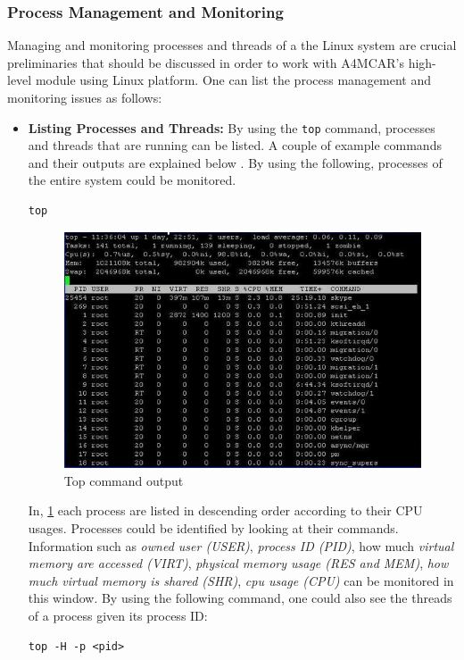 \subsubsection{Process Management and Monitoring}
Managing and monitoring processes and threads of a the Linux system are crucial preliminaries that should be discussed in order to work with A4MCAR's high-level module using Linux platform. One can list the process management and monitoring issues as follows:
\begin{itemize}
	\item \textbf{Listing Processes and Threads:}
	By using the \texttt{top} command, processes and threads that are running can be listed. A couple of example commands and their outputs are explained below \cite{topexamples}. By using the following, processes of the entire system could be monitored.
	\begin{lstlisting}[style=bash]
		top
	\end{lstlisting}
	\begin{figure}[!ht]
		\centering
		\captionsetup{justification=centering}
		\includegraphics[width=\textwidth]{content/images/topexample1.png}
		\caption{Top command output}
		\label{fig:topexample1}
	\end{figure}
	In, \ref{fig:topexample1} each process are listed in descending order according to their CPU usages. Processes could be identified by looking at their commands. Information such as \textit{owned user (USER)}, \textit{process ID (PID)}, how much \textit{virtual memory are accessed (VIRT)}, \textit{physical memory usage (RES and MEM)}, \textit{how much virtual memory is shared (SHR)}, \textit{cpu usage (CPU)} can be monitored in this window. By using the following command, one could also see the threads of a process given its process ID:
	\begin{lstlisting}[style=bash]
	top -H -p <pid>
	\end{lstlisting}
	

\end{itemize}
